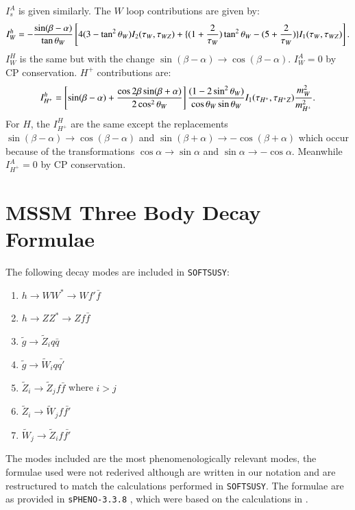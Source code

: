 \documentclass[final,3p,times,pdflatex]{elsarticle}
\begin{document}
$I_{s}^A$ is given similarly.
The $W$ loop contributions are given by:
\begin{equation}
I_{W}^h = -{\sin(\beta - \alpha) \over \tan\theta_W}\left[4(3-\tan^2 \theta_W)I_{2} (\tau_W, \tau_{WZ}) + \{(1+{2 \over \tau_W})\tan^2 \theta_W - (5 + {2 \over \tau_W})\}I_{1}(\tau_W, \tau_{WZ})\right].
\end{equation}
$I_{W}^H$ is the same but with the change $\sin(\beta - \alpha) \rightarrow \cos(\beta - \alpha)$. $I_{W}^A = 0$ by CP conservation.
$H^+$ contributions are:
\begin{equation}
I_{H^+}^h = \left[\sin(\beta - \alpha) + {\cos 2\beta \sin(\beta+\alpha) \over 2 \cos^2 \theta_W}\right]{(1-2\sin^2 \theta_W) \over \cos\theta_W \sin\theta_W} I_{1}(\tau_{H^+},\tau_{H^+ Z}){m_{W}^2 \over m_{H^+}^2}.
\end{equation}
For $H$, the $I_{H^+}^H$ are the same except the replacements $\sin(\beta - \alpha) \rightarrow \cos(\beta - \alpha)$ and $ \sin(\beta+\alpha) \rightarrow -\cos(\beta+\alpha)$ which occur because of the transformations $\cos\alpha \rightarrow \sin\alpha$ and $ \sin\alpha \rightarrow -\cos\alpha$. Meanwhile $I_{H^+}^A = 0$ by CP conservation.


\section{MSSM Three Body Decay Formulae} \label{appendix:MSSM3body}
The following decay modes are included in {\tt {\tt SOFTSUSY}}:
\begin{enumerate}
\item $h \rightarrow WW^* \rightarrow W f' \bar{f}$ 
\item $h \rightarrow ZZ^* \rightarrow Z f \bar{f}$ 
\item $\tilde{g} \rightarrow \tilde{Z}_i q \bar{q}$
\item $\tilde{g} \rightarrow \tilde{W}_i q \bar{q'}$
\item $\tilde{Z}_{i} \rightarrow \tilde{Z}_j f \bar{f}$ where $i>j$
\item $\tilde{Z}_{i} \rightarrow \tilde{W}_j f \bar{f'}$
\item $\tilde{W}_{j} \rightarrow \tilde{Z}_i f \bar{f'}$
\end{enumerate}
The modes included are the most phenomenologically relevant modes, the formulae used were not rederived although are written in our notation and are restructured to match the calculations performed in {\tt SOFTSUSY}. The formulae are as provided in {\tt sPHENO-3.3.8} \cite{Porod:2003um,Porod:2011}, which were based on the calculations in \cite{Baer:1998, Djouadi:2001ma}.
\end{document}
